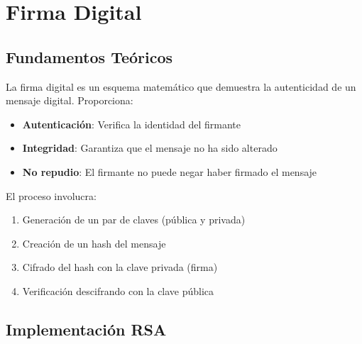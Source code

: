 \documentclass[12pt,a4paper]{article}
\begin{document}
\newpage

\section{Firma Digital}

\subsection{Fundamentos Teóricos}

La firma digital es un esquema matemático que demuestra la autenticidad de un
mensaje digital. Proporciona:

\begin{itemize}
    \item \textbf{Autenticación}: Verifica la identidad del firmante
    \item \textbf{Integridad}: Garantiza que el mensaje no ha sido alterado
    \item \textbf{No repudio}: El firmante no puede negar haber firmado el mensaje
\end{itemize}

El proceso involucra:
\begin{enumerate}
    \item Generación de un par de claves (pública y privada)
    \item Creación de un hash del mensaje
    \item Cifrado del hash con la clave privada (firma)
    \item Verificación descifrando con la clave pública
\end{enumerate}

\subsection{Implementación RSA}
\end{document}
